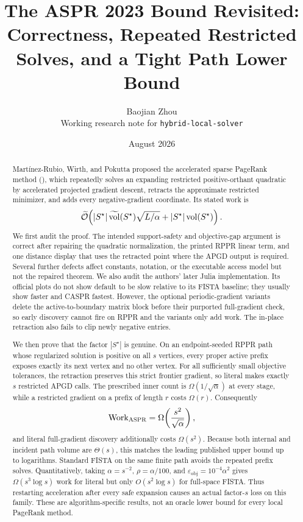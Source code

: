 \documentclass[11pt]{article}
\title{The ASPR 2023 Bound Revisited:\\
Correctness, Repeated Restricted Solves, and a Tight Path Lower Bound}
\author{Baojian Zhou\\
\small Working research note for \texttt{hybrid-local-solver}}
\date{August 2026}
\begin{document}
\maketitle

\begin{abstract}
Mart\'inez-Rubio, Wirth, and Pokutta proposed the accelerated sparse PageRank
method (\ASPR{}), which repeatedly solves an expanding restricted
positive-orthant quadratic by accelerated projected gradient descent, retracts
the approximate restricted minimizer, and adds every negative-gradient
coordinate.  Its stated work is
\[
 \widetilde{\mathcal{O}}\!\left(
   |S^\star|\,\widetilde{\operatorname{vol}}(S^\star)\sqrt{L/\alpha}
   +|S^\star|\operatorname{vol}(S^\star)
 \right).
\]
We first audit the proof.  The intended support-safety and objective-gap
argument is correct after repairing the quadratic normalization, the printed
RPPR linear term, and one distance display that uses the retracted point where
the APGD output is required.  Several further defects affect constants,
notation, or the executable access model but not the repaired theorem.
We also audit the authors' later Julia implementation.  Its official plots do
not show default \ASPR{} to be slow relative to its FISTA baseline; they
usually show \ASPR{} faster and CASPR fastest.  However, the optional
periodic-gradient variants delete the active-to-boundary matrix block before
their purported full-gradient check, so early discovery cannot fire on RPPR
and the variants only add work.  The in-place retraction also fails to clip
newly negative entries.

We then prove that the factor $|S^\star|$ is genuine.  On an endpoint-seeded
RPPR path whose regularized solution is positive on all $s$ vertices, every
proper active prefix exposes exactly its next vertex and no other vertex.
For all sufficiently small objective tolerances, the retraction preserves this
strict frontier gradient, so literal \ASPR{} makes exactly $s$ restricted
APGD calls.  The prescribed inner count is
$\Omega(1/\sqrt\alpha)$ at every stage, while a restricted gradient on a
prefix of length $r$ costs $\Omega(r)$.  Consequently
\[
 \operatorname{Work}_{\textsc{ASPR}}
 =\Omega\!\left(\frac{s^2}{\sqrt\alpha}\right),
\]
and literal full-gradient discovery additionally costs $\Omega(s^2)$.
Because both internal and incident path volume are $\Theta(s)$, this matches
the leading published upper bound up to logarithms.  Standard FISTA on the
same finite path avoids the repeated prefix solves.  Quantitatively, taking
$\alpha=s^{-2}$, $\rho=\alpha/100$, and
$\varepsilon_{\mathrm{obj}}=10^{-4}\alpha^2$ gives
$\Omega(s^3\log s)$ work for literal \ASPR{} but only
$O(s^2\log s)$ for full-space FISTA.  Thus restarting acceleration after
every safe expansion causes an actual factor-$s$ loss on this family.  These
are algorithm-specific results, not an oracle lower bound for every local
PageRank method.
\end{abstract}
\end{document}
